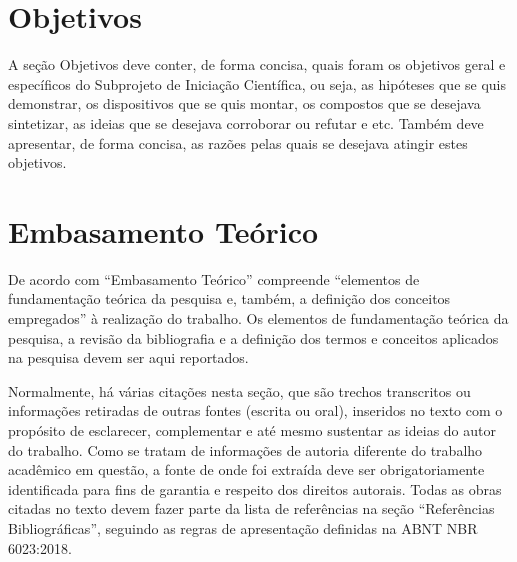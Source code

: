 \documentclass[10pt, a4paper]{article}
\begin{document}
\section{Objetivos}
\label{sec-objetivos}

A seção Objetivos deve conter, de forma concisa, quais foram os objetivos geral e específicos do Subprojeto de Iniciação Científica, ou seja, as hipóteses que se quis demonstrar, os dispositivos que se quis montar, os compostos que se desejava sintetizar, as ideias que se desejava corroborar ou refutar e etc. Também deve apresentar, de forma concisa, as razões pelas quais se desejava atingir estes objetivos.



\section{Embasamento Teórico}
\label{sec-embasamento}

De acordo com \cite{prodanov-freitas:book2013} ``Embasamento Teórico'' compreende ``elementos de fundamentação teórica da pesquisa e, também, a definição dos conceitos empregados'' à realização do trabalho. Os elementos de fundamentação teórica da pesquisa, a revisão da bibliografia e a definição dos termos e conceitos aplicados na pesquisa devem ser aqui reportados.

Normalmente, há várias citações nesta seção, que são trechos transcritos ou informações retiradas de outras fontes (escrita ou oral), inseridos no texto com o propósito de esclarecer, complementar e até mesmo sustentar as ideias do autor do trabalho. Como se tratam de informações de autoria diferente do trabalho acadêmico em questão, a fonte de onde foi extraída deve ser obrigatoriamente identificada para fins de garantia e respeito dos direitos autorais. Todas as obras citadas no texto devem fazer parte da lista de referências na seção ``Referências Bibliográficas'', seguindo as regras de apresentação definidas na ABNT NBR 6023:2018.
\end{document}
